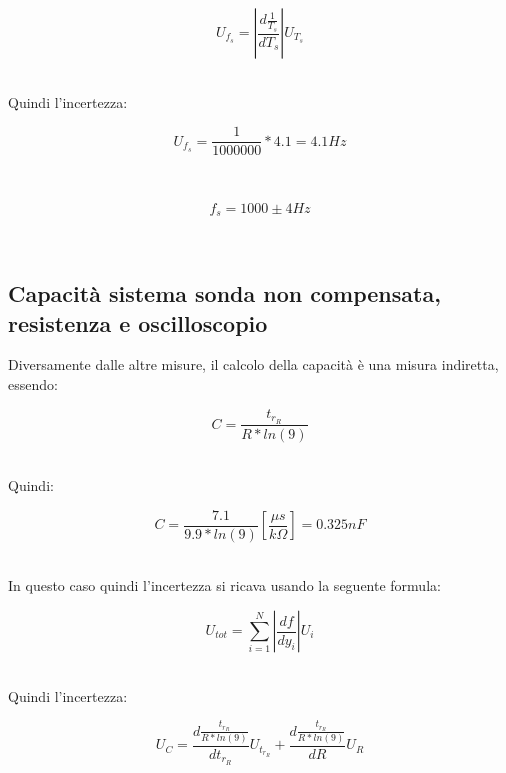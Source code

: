 \documentclass[a4paper]{article}
\begin{document}
\begin{Large}
	\begin{equation}
		{U_{f_s}}= |\frac{d\frac{1}{T_s}}{d{T_s}}|U_{{T_s}}
	\end{equation}
\end{Large}\\
Quindi l'incertezza:
\begin{Large}
	\begin{equation}
		{U_{f_s}}= \frac{1}{1000000}*4.1=4.1 Hz
	\end{equation}
\end{Large}\\
\begin{Large}
	\begin{equation}
  		{f_s}= 1000\pm 4Hz
	\end{equation}
\end{Large}\\

\subsection{Capacità sistema sonda non compensata, resistenza e oscilloscopio}
Diversamente dalle altre misure, il calcolo della capacità è una misura indiretta, essendo: 
\begin{Large}
	\begin{equation}
  		C= \frac{t_{r_R}}{R*ln(9)}
	\end{equation}
\end{Large}\\

Quindi:
\begin{Large}
	\begin{equation}
  		C= \frac{7.1}{9.9*ln(9)} [\frac{\mu s}{k\Omega}]= 0.325nF
	\end{equation}
\end{Large}\\

In questo caso quindi l'incertezza si ricava usando la seguente formula: 
\begin{Large}
	\begin{equation}
		U_{tot}=\sum_{i=1}^{N}|{\frac{df}{dy_i}}| U_i
	\end{equation}
\end{Large}\\

Quindi l'incertezza:
\begin{Large}
	\begin{equation}
		{U_C}= \frac{d\frac{t_{r_R}}{R*ln(9)}}{dt_{r_R}}U_{t_{r_R}}+\frac{d\frac{t_{r_R}}{R*ln(9)}}{dR}U_{R}
	\end{equation}
\end{Large}\\
\end{document}
